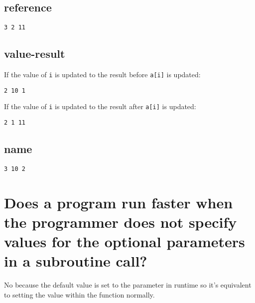 \documentclass[letterpaper]{article}
\begin{document}
\subsection{reference}
\begin{adjustwidth}{2.35em}{0pt}
\begin{Verbatim}
3 2 11
\end{Verbatim}
\end{adjustwidth}
\subsection{value-result}
\begin{adjustwidth}{2.35em}{0pt}
If the value of \texttt{i} is updated to the result before \texttt{a[i]} is updated:
\begin{Verbatim}
2 10 1
\end{Verbatim}
If the value of \texttt{i} is updated to the result after \texttt{a[i]} is updated:
\begin{Verbatim}
2 1 11
\end{Verbatim}
\end{adjustwidth}
\subsection{name}
\begin{adjustwidth}{2.35em}{0pt}
\begin{Verbatim}
3 10 2
\end{Verbatim}
\end{adjustwidth}

\section{Does a program run faster when the programmer does not specify values for the optional parameters in a subroutine call?}
\begin{adjustwidth}{2.35em}{0pt}
No because the default value is set to the parameter in runtime so it's equivalent to setting the value within the function normally.
\end{adjustwidth}
\end{document}
